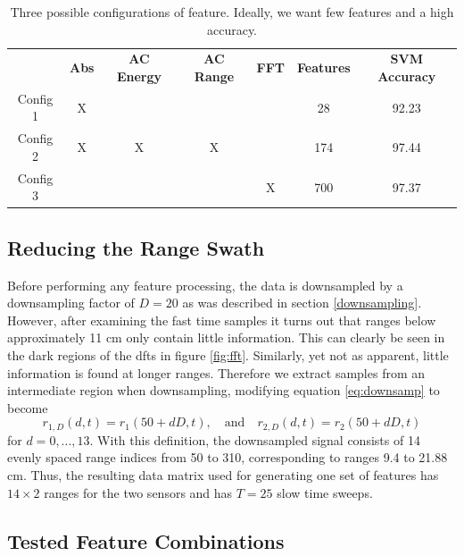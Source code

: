 \begin{table}
\begin{center}
  \begin{tabular}{|c|cccccc|}
\hline
    \rowcolor{gray!150}
		  & \color{white}\textbf{Abs} & \color{white}\textbf{AC Energy} & \color{white}\textbf{AC Range} & \color{white}\textbf{FFT} & \color{white}\textbf{Features} & \color{white}\textbf{SVM Accuracy} \\
	  Config 1 & X &   &   &   & 28  & 92.23 \\
	  Config 2 & X & X & X & & 174 & 97.44 \\
	  Config 3 & & & & X & 700 & 97.37 \\
\hline
  \end{tabular}
\end{center}
\caption{Three possible configurations of feature. Ideally, we want few features and a high accuracy.}
\label{tab:feat}
\end{table}



\subsection{Reducing the Range Swath}

Before performing any feature processing, the data is downsampled by a downsampling factor of $D=20$ as was described in section \ref{downsampling}. However, after examining the fast time samples it turns out that ranges below approximately 11 cm only contain little information. This can clearly be seen in the dark regions of the \gls{dft}s in figure \ref{fig:fft}. Similarly, yet not as apparent, little information is found at longer ranges. Therefore we extract samples from an intermediate region when downsampling, modifying equation \eqref{eq:downsamp} to become
\begin{equation}
	r_{1,D}(d, t) = r_{1}(50+dD,t), 
	\quad \text{and} \quad r_{2,D}(d,t) = r_{2}(50+dD,t)
\end{equation}
for $d=0,...,13$. With this definition, the downsampled signal consists of 14 evenly spaced range indices from 50 to 310, corresponding to ranges 9.4 to 21.88 cm. Thus, the resulting data matrix used for generating one set of features has $14\times 2$ ranges for the two sensors and has $T=25$ slow time sweeps. 

\subsection{Tested Feature Combinations}

